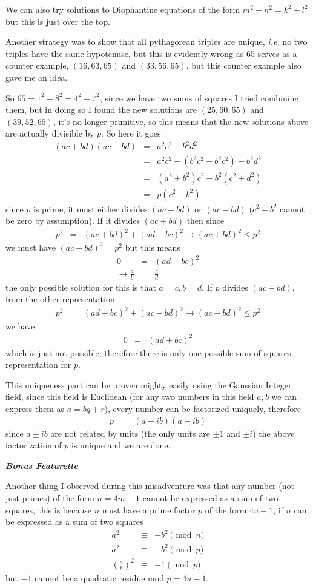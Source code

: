 \documentclass[aps,preprint,preprintnumbers,nofootinbib,showpacs,prd]{revtex4-1}
\newcommand{\ie}{{\it i.e.} }
\newcommand{\nbea}{\begin{eqnarray*}}
\newcommand{\neea}{\end{eqnarray*}}
\begin{document}
We can also try solutions to Diophantine equations of the form $m^2 + n^2 = k^2 + l^2$ but this is just over the top.

Another strategy was to show that all pythagorean triples are unique, \ie no two triples have the same hypotenuse, but this is evidently wrong as 65 serves as a counter example, $(16,63,65)$ and $(33,56,65)$, but this counter example also gave me an idea.

So $65 = 1^2 + 8^2 = 4^2 + 7^2$, since we have two sums of squares I tried combining them, but in doing so I found the new solutions are $(25,60,65)$ and $(39, 52, 65)$, it's no longer primitive, so this means that the new solutions above are actually divisible by $p$. So here it goes
%
\nbea
(ac + bd)(ac - bd) & = & a^2c^2 - b^2d^2 \\
& = & a^2c^2 + (b^2c^2 - b^2c^2)- b^2d^2 \\
& = & (a^2 + b^2)c^2 - b^2(c^2 + d^2) \\
& = & p(c^2 - b^2)
\neea
%
since $p$ is prime, it must either divides $(ac + bd)$ or $(ac - bd)$ ($c^2 - b^2$ cannot be zero by assumption). If it divides $(ac + bd)$ then since
%
\nbea
p^2 & = & (ac + bd)^2 + (ad-bc)^2 \longrightarrow (ac + bd)^2 \le p^2
\neea
%
we must have $(ac + bd)^2 = p^2$ but this means
%
\nbea
0 & = & (ad-bc)^2 \\
\to \frac{a}{b} & = & \frac{c}{d}
\neea
%
the only possible solution for this is that $a=c, b=d$. If $p$ divides $(ac - bd)$, from the other representation
%
\nbea
p^2 & = & (ad + bc)^2 + (ac-bd)^2 \longrightarrow (ac-bd)^2 \le p^2
\neea
%
we have 
%
\nbea
0 & = & (ad + bc)^2
\neea
%
which is just not possible, therefore there is only one possible sum of squares representation for $p$.

This uniqueness part can be proven mighty easily using the Gaussian Integer field, since this field is Euclidean (for any two numbers in this field $a, b$ we can express them as $a = bq + r$), every number can be factorized uniquely, therefore
%
\nbea
p & = & (a + ib)(a - ib)
\neea
%
since $a \pm ib$ are not related by units (the only units are $\pm1$ and $\pm i$) the above factorization of $p$ is unique and we are done.

\smallskip
\underline{\textit{\textbf{Bonus Featurette}}}
\smallskip

Another thing I observed during this misadventure was that any number (not just primes) of the form $n = 4m-1$ cannot be expressed as a sum of two squares, this is because $n$ must have a prime factor $p$ of the form $4u-1$, if $n$ can be expressed as a sum of two squares
%
\nbea
a^2 & \equiv & - b^2 \pmod{n} \\
a^2 & \equiv & - b^2 \pmod{p} \\
\left(\frac{a}{b}\right)^2 & \equiv & - 1 \pmod{p}
\neea
%
but $-1$ cannot be a quadratic residue mod $p = 4u-1$.
\end{document}
